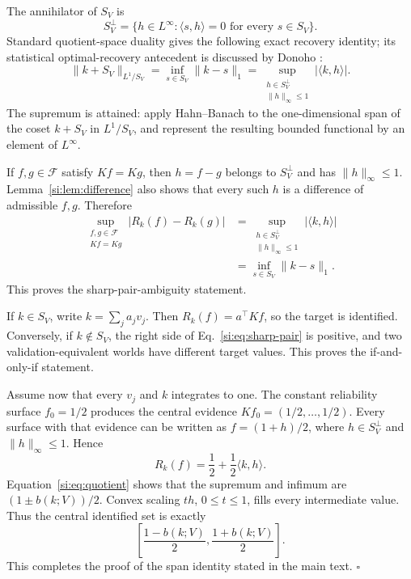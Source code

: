 \documentclass[10pt,twocolumn]{article}
\newcommand{\cF}{\mathcal F}
\begin{document}
The annihilator of $S_V$ is
\begin{equation}
S_V^\perp=\{h\in L^\infty:\langle s,h\rangle=0\text{ for every }s\in S_V\}.
\label{si:eq:annihilator}
\end{equation}
Standard quotient-space duality gives the following exact recovery identity; its statistical optimal-recovery antecedent is discussed by Donoho \citep[Secs.~2--3, pp.~242--259]{donoho1994}:
\begin{equation}
\|k+S_V\|_{L^1/S_V}
=\inf_{s\in S_V}\|k-s\|_1
=\sup_{\substack{h\in S_V^\perp\\\|h\|_\infty\le1}}|\langle k,h\rangle|.
\label{si:eq:quotient}
\end{equation}
The supremum is attained: apply Hahn--Banach to the one-dimensional span of the coset $k+S_V$ in $L^1/S_V$, and represent the resulting bounded functional by an element of $L^\infty$.

If $f,g\in\cF$ satisfy $Kf=Kg$, then $h=f-g$ belongs to $S_V^\perp$ and has $\|h\|_\infty\le1$. Lemma~\ref{si:lem:difference} also shows that every such $h$ is a difference of admissible $f,g$. Therefore
\begin{align}
\sup_{\substack{f,g\in\cF\\Kf=Kg}}
|R_k(f)-R_k(g)|
&=\sup_{\substack{h\in S_V^\perp\\\|h\|_\infty\le1}}
|\langle k,h\rangle|\nonumber\\
&=\inf_{s\in S_V}\|k-s\|_1.
\label{si:eq:sharp-pair}
\end{align}
This proves the sharp-pair-ambiguity statement.

If $k\in S_V$, write $k=\sum_ja_jv_j$. Then $R_k(f)=a^\top Kf$, so the target is identified. Conversely, if $k\notin S_V$, the right side of Eq.~\ref{si:eq:sharp-pair} is positive, and two validation-equivalent worlds have different target values. This proves the if-and-only-if statement.

Assume now that every $v_j$ and $k$ integrates to one. The constant reliability surface $f_0=1/2$ produces the central evidence $Kf_0=(1/2,\ldots,1/2)$. Every surface with that evidence can be written as $f=(1+h)/2$, where $h\in S_V^\perp$ and $\|h\|_\infty\le1$. Hence
\begin{equation}
R_k(f)=\frac12+\frac12\langle k,h\rangle.
\label{si:eq:central-target}
\end{equation}
Equation~\ref{si:eq:quotient} shows that the supremum and infimum are $(1\pm b(k;V))/2$. Convex scaling $th$, $0\le t\le1$, fills every intermediate value. Thus the central identified set is exactly
\begin{equation}
\left[\frac{1-b(k;V)}2,\frac{1+b(k;V)}2\right].
\label{si:eq:central-interval}
\end{equation}
This completes the proof of the span identity stated in the main text. \hfill$\square$
\end{document}

